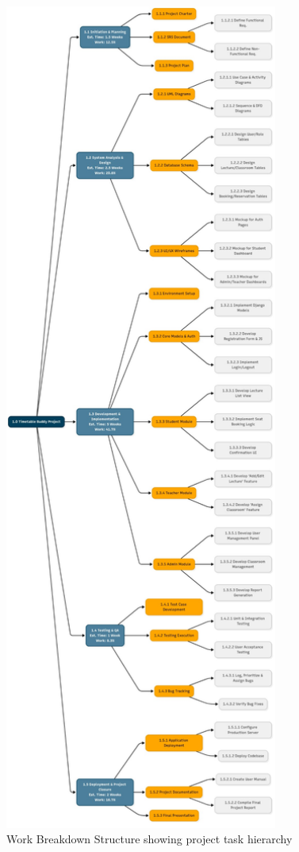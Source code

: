 \begin{figure}[htbp]
    \centering
    \includegraphics[width=0.8\textwidth,height=0.6\textheight,keepaspectratio]{images/WBS.jpg}
    \caption{Work Breakdown Structure showing project task hierarchy}
    \label{fig:wbs}
\end{figure}

